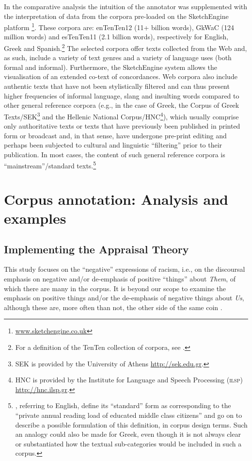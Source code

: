 \documentclass[output=paper]{LSP/langsci}
\begin{document}
In the comparative analysis the intuition of the annotator was supplemented with the interpretation of data from the corpora pre-loaded on the SketchEngine platform \citep{Kilgarriff2004}\footnote{\url{www.sketchengine.co.uk}}. These corpora are: enTenTen12 (11+ billion words), GkWaC (124 million words) and esTenTen11 (2.1 billion words), respectively for English, Greek and Spanish.\footnote{For a definition of the TenTen collection of corpora, see \citet{ Jakubicek2013}.} The selected corpora offer texts collected from the Web and, as such, include a variety of text genres and a variety of language uses (both formal and informal). Furthermore, the SketchEngine system allows the visualisation of an extended co-text of concordances. Web corpora also include authentic texts that have not been stylistically filtered and can thus present higher frequencies of informal language, slang and insulting words compared to other general reference corpora (e.g., in the case of Greek, the Corpus of Greek Texts/SEK\footnote{SEK is provided by the University of Athens \url{http://sek.edu.gr}.} and the Hellenic National Corpus/HNC\footnote{HNC is provided by the Institute for Language and Speech Processing (\textsc{ilsp}) \url{http://hnc.ilsp.gr}.}), which usually comprise only authoritative texts or texts that have previously been published in printed form or broadcast and, in that sense, have undergone pre-print editing and perhaps been subjected to cultural and linguistic “filtering” prior to their publication. In most cases, the content of such general reference corpora is “mainstream”/standard texts.\footnote{\citet[65--66]{Teubert2007}, referring to English, define its “standard” form as corresponding to the “private annual reading load of educated middle class citizens” and go on to describe a possible formulation of this definition, in corpus design terms. Such an analogy could also be made for Greek, even though it is not always clear or substantiated how the textual sub-categories would be included in such a corpus.}

\section{Corpus annotation: Analysis and examples} \label{sec:2:4} 
\subsection{Implementing the Appraisal Theory} \label{sec:2:4:1}

This study focuses on the “negative” expressions of racism, i.e., on the discoursal emphasis on negative and/or de-emphasis of positive “things” about \textit{Them}, of which there are many in the corpus. It is beyond our scope to examine the emphasis on positive things and/or the de-emphasis of negative things about \textit{Us}, although these are, more often than not, the other side of the same coin \citep[44]{Dijk2000b}.
\end{document}
